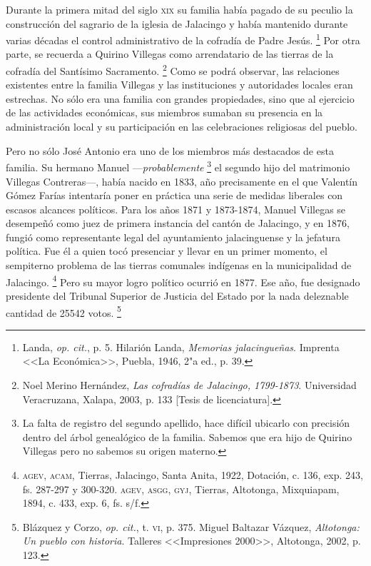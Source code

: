 \documentclass[14pt,twoside,final]{extbook} %
\let\oldfootnote\footnote
\renewcommand\footnote[1]{%
\oldfootnote{\hspace{1mm}#1}}
\begin{document}
Durante la primera mitad del siglo \textsc{xix} su familia había pagado de su peculio la construcción del sagrario de la iglesia de Jalacingo y había mantenido durante varias décadas el control administrativo de la cofradía de Padre Jesús.\footnote{Landa, \emph{op. cit.}, p. 5. Hilarión Landa, \emph{Memorias jalacingueñas}. Imprenta <<La Económica>>, Puebla, 1946, 2"a ed., p. 39.} Por otra parte, se recuerda a Quirino Villegas como arrendatario de las tierras de la cofradía del Santísimo Sacramento.\footnote{Noel Merino Hernández, \emph{Las cofradías de Jalacingo, 1799-1873}. Universidad Veracruzana, Xalapa, 2003, p. 133 [Tesis de licenciatura].} Como se podrá observar, las relaciones existentes entre la familia Villegas y las instituciones y autoridades locales eran estrechas. No sólo era una familia con grandes propiedades, sino que al ejercicio de las actividades económicas, sus miembros sumaban su presencia en la administración local y su participación en las celebraciones religiosas del pueblo.

Pero no sólo José Antonio era uno de los miembros más destacados de esta familia. Su hermano Manuel ---\emph{probablemente}\footnote{La falta de registro del segundo apellido, hace difícil ubicarlo con precisión dentro del árbol genealógico de la familia. Sabemos que era hijo de Quirino Villegas pero no sabemos su origen materno.} el segundo hijo del matrimonio Villegas Contreras---, había nacido en 1833, año precisamente en el que Valentín Gómez Farías intentaría poner en práctica una serie de medidas liberales con escasos alcances políticos. Para los años 1871 y 1873-1874, Manuel Villegas se desempeñó como juez de primera instancia del cantón de Jalacingo, y en 1876, fungió como representante legal del ayuntamiento jalacinguense y la jefatura política. Fue él a quien tocó presenciar y llevar en un primer momento, el sempiterno problema de las tierras comunales indígenas en la municipalidad de Jalacingo.\footnote{\textsc{agev, acam}, Tierras, Jalacingo, Santa Anita, 1922, Dotación, c. 136, exp. 243, fs. 287-297 y 300-320. \textsc{agev, asgg, gyj}, Tierras, Altotonga, Mixquiapam, 1894, c. 433, exp. 6, fs. s/f.} Pero su mayor logro político ocurrió en 1877. Ese año, fue designado presidente del Tribunal Superior de Justicia del Estado por la nada deleznable cantidad de 25542 votos.\footnote{Blázquez y Corzo, \emph{op. cit.}, t. \textsc{vi}, p. 375. Miguel Baltazar Vázquez, \emph{Altotonga: Un pueblo con historia}. Talleres <<Impresiones 2000>>, Altotonga, 2002, p. 123.}
\end{document}
